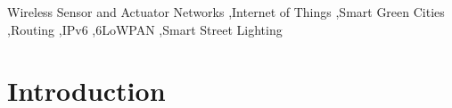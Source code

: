 \documentclass[final,authoryear,3p,twocolumn]{elsarticle}
\begin{document}
\begin{frontmatter}

%




\begin{keyword}
Wireless Sensor and Actuator Networks  \sep Internet of Things \sep Smart Green Cities \sep Routing \sep IPv6 \sep 6LoWPAN \sep Smart Street Lighting



\end{keyword}

\end{frontmatter}


\section{Introduction}
\end{document}
